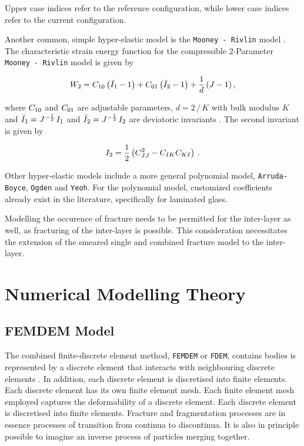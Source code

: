 \documentclass[format=acmtog,12pt,screen=true,review=false,natbib=false,]{acmart}
\begin{document}
Upper case indices refer to the reference configuration, while lower case indices refer to the current configuration.

\bigbreak
Another common, simple hyper-elastic model is the \texttt{Mooney - Rivlin} model \cite{Aba13, Kum16}. The characteristic strain energy function for the compressible 2-Parameter \texttt{Mooney - Rivlin} model \cite{Kum16} is given by

\begin{equation}
    \label{eq:MooneyRivlinSEF}
    W_{\rm{2}} = C_{\rm{10}}\left(\bar{I}_{\rm{1}}-1\right)+C_{\rm{01}}\left(\bar{I}_{\rm{2}}-1\right)+\frac{1}{d}\,(J-1)\,,
\end{equation}

where $C_{\rm{10}}$ and $C_{\rm{01}}$ are adjustable parameters, $d=2\,/\,K$ with bulk modulus $K$ and $\bar{I}_{\rm{1}}=J^{-\frac{1}{3}}\,I_{\rm{1}}$ and $\bar{I}_{\rm{2}}=J^{-\frac{1}{3}}\,I_{\rm{2}}$ are deviatoric invariants \cite{Aba13}. The second invariant is given by

\begin{equation}
    I_{\rm{2}}=\frac{1}{2}\left(C^2_{JJ}-C_{IK}C_{KI}\right)\,.
\end{equation}

\bigbreak
Other hyper-elastic models \cite{Aba13} include a more general polynomial model, \texttt{Arruda-Boyce}, \texttt{Ogden} and \texttt{Yeoh}. For the polynomial model, customized coefficients \cite{Sam19} already exist in the literature, specifically for laminated glass.

\bigbreak
Modelling the occurence of fracture needs to be permitted for the inter-layer as well, as fracturing of the inter-layer is possible. This consideration necessitates the extension of the smeared single and combined fracture model to the inter-layer.

\section{Numerical Modelling Theory}
\label{sec:NumericsTheory}

\subsection{FEMDEM Model}
The combined finite-discrete element method, \texttt{FEMDEM} or \texttt{FDEM}, contains bodies is represented by a discrete element that interacts with neighbouring discrete elements . In addition, each discrete element is discretised into finite elements. Each discrete element has its own finite element mesh. Each finite element mesh employed captures the deformability of a discrete element. Each discrete element is discretised into finite elements. Fracture and fragmentation processes are in essence processes of transition from continua to discontinua. It is also in principle possible to imagine an inverse process of particles merging together.\cite{Mun04}
\end{document}
